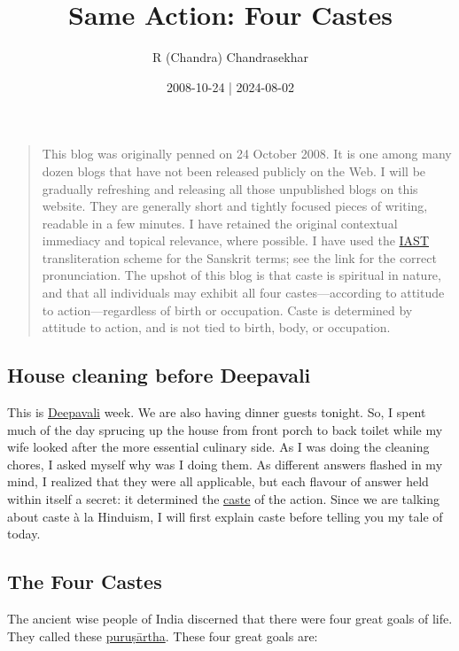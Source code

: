 \documentclass[
  a4paper,
]{article}
\title{Same Action: Four Castes}
\author{R (Chandra) Chandrasekhar}
\date{2008-10-24 | 2024-08-02}
\begin{document}
\maketitle

\thispagestyle{empty}


\begin{quote}
This blog was originally penned on 24 October 2008. It is one among many
dozen blogs that have not been released publicly on the Web. I will be
gradually refreshing and releasing all those unpublished blogs on this
website. They are generally short and tightly focused pieces of writing,
readable in a few minutes. I have retained the original contextual
immediacy and topical relevance, where possible. I have used the
\href{https://en.wikipedia.org/wiki/International_Alphabet_of_Sanskrit_Transliteration}{IAST}
transliteration scheme for the Sanskrit terms; see the link for the
correct pronunciation. The upshot of this blog is that caste is
spiritual in nature, and that all individuals may exhibit all four
castes---according to attitude to action---regardless of birth or
occupation. Caste is determined by attitude to action, and is not tied
to birth, body, or occupation.
\end{quote}

\subsection{House cleaning before
Deepavali}\label{house-cleaning-before-deepavali}

This is \href{https://en.wikipedia.org/wiki/Diwali}{Deepavali} week. We
are also having dinner guests tonight. So, I spent much of the day
sprucing up the house from front porch to back toilet while my wife
looked after the more essential culinary side. As I was doing the
cleaning chores, I asked myself why was I doing them. As different
answers flashed in my mind, I realized that they were all applicable,
but each flavour of answer held within itself a secret: it determined
the \href{https://www.thefreedictionary.com/caste}{caste} of the action.
Since we are talking about caste à la Hinduism, I will first explain
caste before telling you my tale of today.

\subsection{The Four Castes}\label{the-four-castes}

The ancient wise people of India discerned that there were four great
goals of life. They called these
\href{https://en.wikipedia.org/wiki/Puru\%E1\%B9\%A3\%C4\%81rtha}{puruṣārtha}.
These four great goals are:
\end{document}
